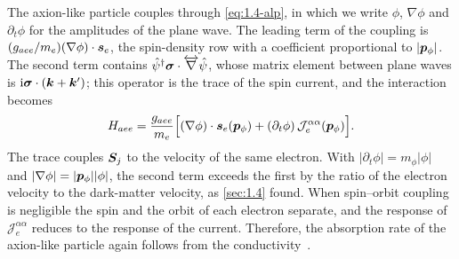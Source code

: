 The axion-like particle couples through \cref{eq:1.4-alp}, in which we write $\phi$, $\nabla\phi$ and $\partial_t\phi$ for the amplitudes of the plane wave. The leading term of the coupling is $(g_{aee}/m_e)(\nabla\phi)\cdot\bm{s}_e$, the spin-density row with a coefficient proportional to $|\bm{p}_\phi|$. The second term contains $\hat{\psi}^\dagger\boldsymbol{\sigma}\cdot\overleftrightarrow{\nabla}\hat{\psi}$, whose matrix element between plane waves is $\mathrm{i}\boldsymbol{\sigma}\cdot(\bm{k} + \bm{k}')$; this operator is the trace of the spin current, and the interaction becomes
\begin{equation}
  H_{aee} = \frac{g_{aee}}{m_e}\Bigl[(\nabla\phi)\cdot\bm{s}_e(\bm{p}_\phi) + (\partial_t\phi)\,\mathcal{J}^{\alpha\alpha}_e(\bm{p}_\phi)\Bigr] .
  \label{eq:8.1-alp}
\end{equation}
The trace couples $\bm{S}_j$ to the velocity of the same electron. With $|\partial_t\phi| = m_\phi|\phi|$ and $|\nabla\phi| = |\bm{p}_\phi||\phi|$, the second term exceeds the first by the ratio of the electron velocity to the dark-matter velocity, as \cref{sec:1.4} found. When spin--orbit coupling is negligible the spin and the orbit of each electron separate, and the response of $\mathcal{J}^{\alpha\alpha}_e$ reduces to the response of the current. Therefore, the absorption rate of the axion-like particle again follows from the conductivity~\cite[Sect.~III\,B]{mitridate2021dark}.

